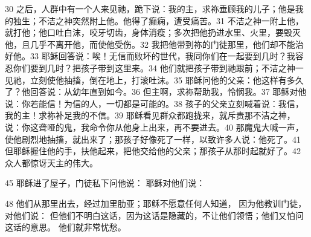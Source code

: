 30 之后，人群中有一个人来见祂，跪下说：我的主，求祢垂顾我的儿子；他是我的独生；不洁之神突然附上他。他得了癫痫，遭受痛苦。31 不洁之神一附上他，就打他；他口吐白沫，咬牙切齿，身体消瘦；多次把他扔进水里、火里，要毁灭他，且几乎不离开他，而使他受伤。32 我把他带到祢的门徒那里，他们却不能治好他。33 耶稣回答说：唉！无信而败坏的世代，我同你们在一起要到几时？我容忍你们要到几时？把孩子带到这里来。34 他们就把孩子带到祂跟前；不洁之神一见祂，立刻使他抽搐，倒在地上，打滚吐沫。35 耶稣问他的父亲：他这样有多久了？他回答说：从幼年直到如今。36 但主啊，求祢帮助我，怜悯我。37 耶稣对他说：你若能信！为信的人，一切都是可能的。38 孩子的父亲立刻喊着说：我信，我的主！求祢补足我的不信。39 耶稣看见群众都跑拢来，就斥责那不洁之神，说：你这聋哑的鬼，我命令你从他身上出来，再不要进去。40 那魔鬼大喊一声，使他剧烈地抽搐，就出来了；那孩子好像死了一样，以致许多人说：他死了。41 但耶稣握住他的手，扶他起来，把他交给他的父亲；那孩子从那时起就好了。42 众人都惊讶天主的伟大。\par

45  耶稣进了屋子，门徒私下问他说： 耶稣对他们说：\par

48  他们从那里出去，经过加里肋亚；耶稣不愿意任何人知道， 因为他教训门徒，对他们说： 但他们不明白这话，因为这话是隐藏的，不让他们领悟；他们又怕问这话的意思。 他们就非常忧愁。\par



\section{}

